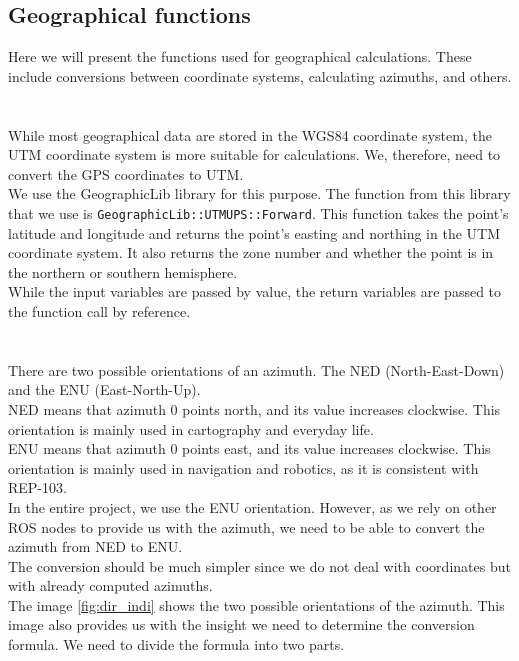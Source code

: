     \subsection{Geographical functions}
    \label{sec:geo_func}
        Here we will present the functions used for geographical calculations. These include conversions between coordinate systems, calculating azimuths, and others.\\\\
        \\
            While most geographical data are stored in the WGS84 coordinate system, the UTM coordinate system is more suitable for calculations. We, therefore, need to convert the GPS coordinates to UTM.\\
            We use the GeographicLib library for this purpose. The function from this library that we use is \texttt{GeographicLib::UTMUPS::Forward}. This function takes the point's latitude and longitude and returns the point's easting and northing in the UTM coordinate system. It also returns the zone number and whether the point is in the northern or southern hemisphere.\\
            While the input variables are passed by value, the return variables are passed to the function call by reference.\\\\
        \\
            There are two possible orientations of an azimuth. The NED (North-East-Down) and the ENU (East-North-Up).\\
            NED means that azimuth 0 points north, and its value increases clockwise. This orientation is mainly used in cartography and everyday life.\\
            ENU means that azimuth 0 points east, and its value increases clockwise. This orientation is mainly used in navigation and robotics, as it is consistent with REP-103.\\
            In the entire project, we use the ENU orientation. However, as we rely on other ROS nodes to provide us with the azimuth, we need to be able to convert the azimuth from NED to ENU.\\
            The conversion should be much simpler since we do not deal with coordinates but with already computed azimuths.\\
            The image \ref{fig:dir_indi} shows the two possible orientations of the azimuth. This image also provides us with the insight we need to determine the conversion formula. We need to divide the formula into two parts.
